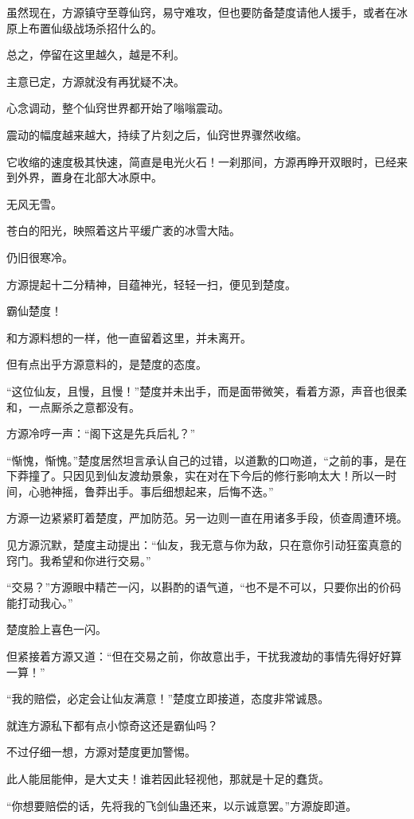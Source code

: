 \begin{this_body}
虽然现在，方源镇守至尊仙窍，易守难攻，但也要防备楚度请他人援手，或者在冰原上布置仙级战场杀招什么的。

总之，停留在这里越久，越是不利。

主意已定，方源就没有再犹疑不决。

心念调动，整个仙窍世界都开始了嗡嗡震动。

震动的幅度越来越大，持续了片刻之后，仙窍世界骤然收缩。

它收缩的速度极其快速，简直是电光火石！一刹那间，方源再睁开双眼时，已经来到外界，置身在北部大冰原中。

无风无雪。

苍白的阳光，映照着这片平缓广袤的冰雪大陆。

仍旧很寒冷。

方源提起十二分精神，目蕴神光，轻轻一扫，便见到楚度。

霸仙楚度！

和方源料想的一样，他一直留着这里，并未离开。

但有点出乎方源意料的，是楚度的态度。

“这位仙友，且慢，且慢！”楚度并未出手，而是面带微笑，看着方源，声音也很柔和，一点厮杀之意都没有。

方源冷哼一声：“阁下这是先兵后礼？”

“惭愧，惭愧。”楚度居然坦言承认自己的过错，以道歉的口吻道，“之前的事，是在下莽撞了。只因见到仙友渡劫景象，实在对在下今后的修行影响太大！所以一时间，心驰神摇，鲁莽出手。事后细想起来，后悔不迭。”

方源一边紧紧盯着楚度，严加防范。另一边则一直在用诸多手段，侦查周遭环境。

见方源沉默，楚度主动提出：“仙友，我无意与你为敌，只在意你引动狂蛮真意的窍门。我希望和你进行交易。”

“交易？”方源眼中精芒一闪，以斟酌的语气道，“也不是不可以，只要你出的价码能打动我心。”

楚度脸上喜色一闪。

但紧接着方源又道：“但在交易之前，你故意出手，干扰我渡劫的事情先得好好算一算！”

“我的赔偿，必定会让仙友满意！”楚度立即接道，态度非常诚恳。

就连方源私下都有点小惊奇这还是霸仙吗？

不过仔细一想，方源对楚度更加警惕。

此人能屈能伸，是大丈夫！谁若因此轻视他，那就是十足的蠢货。

“你想要赔偿的话，先将我的飞剑仙蛊还来，以示诚意罢。”方源旋即道。

\end{this_body}

